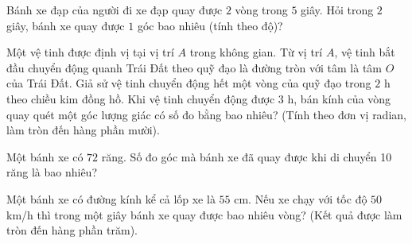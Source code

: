 \begin{ex}%
	Bánh xe  đạp của người đi xe đạp quay được $2$ vòng trong $5$ giây. Hỏi trong $2$ giây, bánh xe quay được $1$ góc bao nhiêu (tính theo độ)?
\end{ex}

\begin{ex}%
	Một vệ tinh được định vị tại vị trí $A$ trong không gian. Từ vị trí $A$, vệ tinh bắt đầu chuyển động quanh Trái Đất theo quỹ đạo là đường tròn với tâm là tâm $O$ của Trái Đất. Giả sử vệ tinh chuyển động hết một vòng của quỹ đạo trong $2$ h theo chiều kim  đồng hồ. Khi vệ tinh chuyển động được $3$ h, bán kính của vòng quay quét một góc lượng giác có số đo bằng bao nhiêu? (Tính theo đơn vị radian, làm tròn đến hàng phần mười).
\end{ex}

\begin{ex}%
	Một bánh xe có $72$ răng. Số đo  góc mà bánh xe đã quay được khi di chuyển 10 răng là bao nhiêu?
\end{ex}

\begin{ex}%
	Một bánh xe có đường kính kể cả lốp xe là $55$ cm. Nếu xe chạy với tốc độ $50$ km/h thì trong một giây bánh xe quay được bao nhiêu vòng? (Kết quả được làm  tròn đến hàng phần trăm).
\end{ex}

